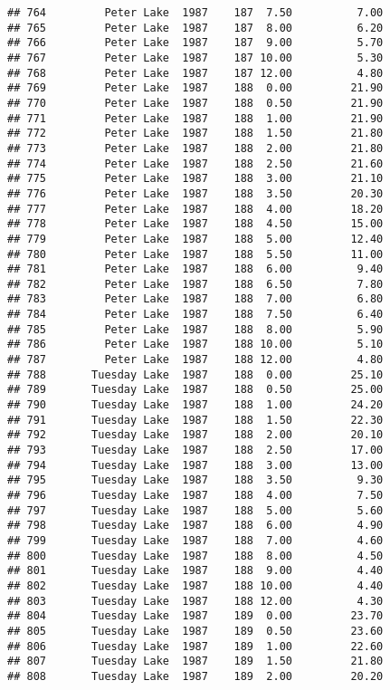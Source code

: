 \documentclass[
]{article}
\begin{document}
\begin{verbatim}
## 764         Peter Lake  1987    187  7.50          7.00
## 765         Peter Lake  1987    187  8.00          6.20
## 766         Peter Lake  1987    187  9.00          5.70
## 767         Peter Lake  1987    187 10.00          5.30
## 768         Peter Lake  1987    187 12.00          4.80
## 769         Peter Lake  1987    188  0.00         21.90
## 770         Peter Lake  1987    188  0.50         21.90
## 771         Peter Lake  1987    188  1.00         21.90
## 772         Peter Lake  1987    188  1.50         21.80
## 773         Peter Lake  1987    188  2.00         21.80
## 774         Peter Lake  1987    188  2.50         21.60
## 775         Peter Lake  1987    188  3.00         21.10
## 776         Peter Lake  1987    188  3.50         20.30
## 777         Peter Lake  1987    188  4.00         18.20
## 778         Peter Lake  1987    188  4.50         15.00
## 779         Peter Lake  1987    188  5.00         12.40
## 780         Peter Lake  1987    188  5.50         11.00
## 781         Peter Lake  1987    188  6.00          9.40
## 782         Peter Lake  1987    188  6.50          7.80
## 783         Peter Lake  1987    188  7.00          6.80
## 784         Peter Lake  1987    188  7.50          6.40
## 785         Peter Lake  1987    188  8.00          5.90
## 786         Peter Lake  1987    188 10.00          5.10
## 787         Peter Lake  1987    188 12.00          4.80
## 788       Tuesday Lake  1987    188  0.00         25.10
## 789       Tuesday Lake  1987    188  0.50         25.00
## 790       Tuesday Lake  1987    188  1.00         24.20
## 791       Tuesday Lake  1987    188  1.50         22.30
## 792       Tuesday Lake  1987    188  2.00         20.10
## 793       Tuesday Lake  1987    188  2.50         17.00
## 794       Tuesday Lake  1987    188  3.00         13.00
## 795       Tuesday Lake  1987    188  3.50          9.30
## 796       Tuesday Lake  1987    188  4.00          7.50
## 797       Tuesday Lake  1987    188  5.00          5.60
## 798       Tuesday Lake  1987    188  6.00          4.90
## 799       Tuesday Lake  1987    188  7.00          4.60
## 800       Tuesday Lake  1987    188  8.00          4.50
## 801       Tuesday Lake  1987    188  9.00          4.40
## 802       Tuesday Lake  1987    188 10.00          4.40
## 803       Tuesday Lake  1987    188 12.00          4.30
## 804       Tuesday Lake  1987    189  0.00         23.70
## 805       Tuesday Lake  1987    189  0.50         23.60
## 806       Tuesday Lake  1987    189  1.00         22.60
## 807       Tuesday Lake  1987    189  1.50         21.80
## 808       Tuesday Lake  1987    189  2.00         20.20

\end{verbatim}
\end{document}
